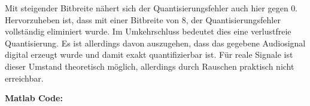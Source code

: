 \begin{enumerate}[label=\alph*)]
	Mit steigender Bitbreite nähert sich der Quantisierungsfehler auch hier gegen 0. Hervorzuheben ist, dass mit einer Bitbreite von 8, der Quantisierungsfehler vollständig eliminiert wurde. Im Umkehrschluss bedeutet dies eine verlustfreie Quantisierung. Es ist allerdings davon auszugehen, dass das gegebene Audiosignal digital erzeugt wurde und damit exakt quantifizierbar ist. Für reale Signale ist dieser Umstand theoretisch möglich, allerdings durch Rauschen praktisch nicht erreichbar.	
\end{enumerate}

\vspace{-4pt}

\textbf{Matlab Code:}
